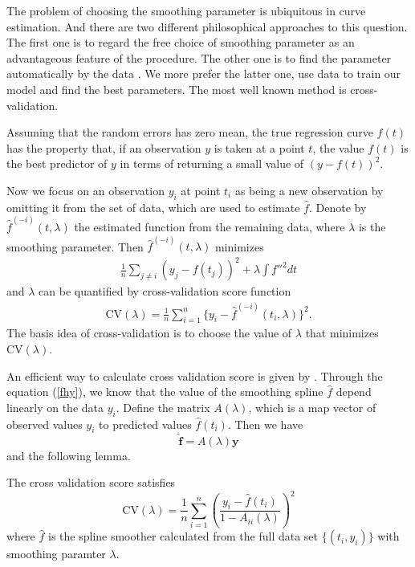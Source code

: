 The problem of choosing the smoothing parameter is ubiquitous in curve estimation. And there are two different philosophical approaches to this question. The first one is to regard the free choice of smoothing parameter as an advantageous feature of the procedure. The other one is to find the parameter automatically by the data \cite{green1993nonparametric}. We more prefer the latter one, use data to train our model and find the best parameters. The most well known method is cross-validation.


Assuming that the random errors has zero mean, the true regression curve $f(t)$ has the property that, if an observation $y$ is taken at a point $t$, the value $f(t)$ is the best predictor of $y$ in terms of returning a small value of $(y-f(t))^2$. 

Now we focus on an observation $y_i$ at point $t_i$ as being a new observation by omitting it from the set of data, which are used to estimate $\hat{f}$. Denote by $\hat{f}^{(-i)}(t,\lambda)$ the estimated function from the remaining data, where $\lambda$ is the smoothing parameter. Then $\hat{f}^{(-i)}(t,\lambda)$ minimizes 
\begin{align}\label{originalcv}
\frac{1}{n}\sum_{j \neq i}(y_j-f(t_j))^2+\lambda \int f''^2dt
\end{align}
 and $\lambda$ can be quantified by cross-validation score function
\begin{align}
\mbox{CV}(\lambda)=\frac{1}{n}\sum_{i=1}^{n}\{y_i-\hat{f}^{(-i)}(t_i,\lambda)\}^2.
\end{align}
The basis idea of cross-validation is to choose the value of $\lambda$ that minimizes $\mbox{CV}(\lambda)$. 

An efficient way to calculate cross validation score is given by \cite{green1993nonparametric}. Through the equation (\ref{fhy}), we know that the value of the smoothing spline $\hat{f}$ depend linearly on the data $y_i$. Define the matrix $A(\lambda)$, which is a map vector of observed values $y_i$ to predicted values $\hat{f}(t_i)$. Then we have
\begin{equation}
\hat{\mathbf{f}}=A(\lambda)\mathbf{y}
\end{equation}
and the following lemma.
\begin{lemma}\label{cvlema}
The cross validation score satisfies
\begin{equation}
\mbox{CV}(\lambda)=\frac{1}{n} \sum_{i=1}^n \left(\frac{y_i-\hat{f}(t_i)}{1-A_{ii}(\lambda)}\right)^2
\end{equation}
where $\hat{f}$ is the spline smoother calculated from the full data set $\{(t_i,y_i)\}$ with smoothing paramter $\lambda$.
\end{lemma}

